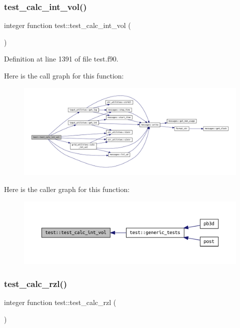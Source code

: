 \subsubsection{\texorpdfstring{test\+\_\+calc\+\_\+int\+\_\+vol()}{test\_calc\_int\_vol()}}
{\footnotesize\ttfamily integer function test\+::test\+\_\+calc\+\_\+int\+\_\+vol (\begin{DoxyParamCaption}{ }\end{DoxyParamCaption})}



Definition at line 1391 of file test.\+f90.

Here is the call graph for this function\+:
\nopagebreak
\begin{figure}[H]
\begin{center}
\leavevmode
\includegraphics[width=350pt]{namespacetest_a0d4cb791bf762b2e52260fea7644a3ee_cgraph}
\end{center}
\end{figure}
Here is the caller graph for this function\+:
\nopagebreak
\begin{figure}[H]
\begin{center}
\leavevmode
\includegraphics[width=350pt]{namespacetest_a0d4cb791bf762b2e52260fea7644a3ee_icgraph}
\end{center}
\end{figure}
\mbox{\label{namespacetest_a4a25e64af6b986091f9e49ba447fc5c4}} 
\subsubsection{\texorpdfstring{test\+\_\+calc\+\_\+rzl()}{test\_calc\_rzl()}}
{\footnotesize\ttfamily integer function test\+::test\+\_\+calc\+\_\+rzl (\begin{DoxyParamCaption}{ }\end{DoxyParamCaption})}




